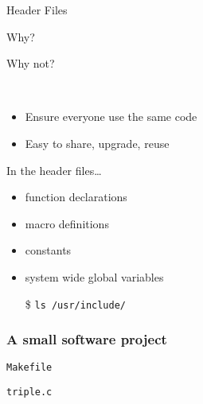 \begin{frame}{Header Files}
  \begin{minipage}{.45\linewidth}
    \begin{iblock}{Why?}
    \end{iblock}
  \end{minipage}\qquad
  \begin{minipage}{.45\linewidth}
    \begin{iblock}{Why not?}
    \end{iblock}
  \end{minipage}\\[1ex]
  \begin{itemize}
  \item Ensure everyone use the same code
  \item Easy to share, upgrade, reuse
  \end{itemize}
  \begin{block}{In the header files\ldots}
    \begin{multicols}{2}
      \begin{itemize}
      \item function declarations
      \item macro definitions
      \item constants
      \item system wide global variables
      \end{itemize}
    \end{multicols}
  \end{block}
  \begin{itemize}
  \item[\$] \texttt{ls /usr/include/}
  \end{itemize}
\end{frame}

\subsubsection{A small software project}
\label{sec:small-softw-proj}

\begin{minipage}[t]{.45\linewidth}
\begin{block}{\texttt{Makefile}}
\end{block}  
\end{minipage}\qquad
\begin{minipage}[t]{.45\linewidth}
\begin{block}{\texttt{triple.c}}
\end{block}  
\end{minipage}

